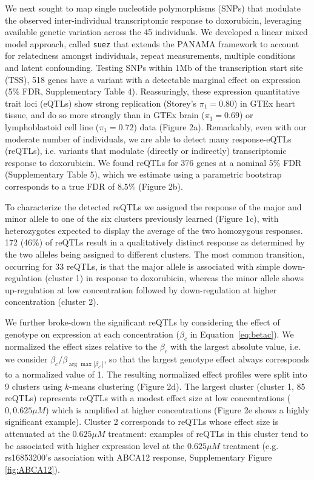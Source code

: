 \documentclass{article}
\begin{document}
We next sought to map single nucleotide polymorphisms (SNPs) that modulate the observed inter-individual transcriptomic response to doxorubicin, leveraging available genetic variation across the 45 individuals\cite{Livne2015}. We developed a linear mixed model approach, called \texttt{suez} that extends the PANAMA framework\citep{Fusi2012} to account for relatedness amongst individuals, repeat measurements, multiple conditions and latent confounding. Testing SNPs within 1Mb of the transcription start site (TSS), 518 genes have a variant with a detectable marginal effect on expression (5\% FDR, Supplementary Table 4). Reassuringly, these expression quantitative trait loci (eQTLs) show strong replication (Storey's $\pi_1=0.80$) in GTEx heart tissue, and do so more strongly than in GTEx brain ($\pi_1=0.69$) or lymphoblastoid cell line ($\pi_1=0.72$) data (Figure 2a). Remarkably, even with our moderate number of individuals, we are able to detect many response-eQTLs (reQTLs), i.e. variants that modulate (directly or indirectly) transcriptomic response to doxorubicin. We found reQTLs for 376 genes at a nominal 5\% FDR (Supplementary Table 5), which we estimate using a parametric bootstrap corresponds to a true FDR of $8.5\%$ (Figure 2b). 

To characterize the detected reQTLs we assigned the response of the major and minor allele to one of the six clusters previously learned (Figure 1c), with heterozygotes expected to display the average of the two homozygous responses. 172 (46\%) of reQTLs result in a qualitatively distinct response as determined by the two alleles being assigned to different clusters. The most common transition, occurring for 33 reQTLs, is that the major allele is associated with simple down-regulation (cluster 1) in response to doxorubicin, whereas the minor allele shows up-regulation at low concentration followed by down-regulation at higher concentration (cluster 2). 

We further broke-down the significant reQTLs by considering the effect of genotype on expression at each concentration ($\beta_c$ in Equation~\ref{eq:betac}). We normalized the effect sizes relative to the $\beta_c$ with the largest absolute value, i.e. we consider $\beta_c / \beta_{\arg \max{ |\beta_{c'}| }} $, so that the largest genotype effect always corresponds to a normalized value of 1. The resulting normalized effect profiles were split into 9 clusters using $k$-means clustering (Figure 2d). The largest cluster (cluster 1, 85 reQTLs) represents reQTLs with a modest effect size at low concentrations ($0,0.625\mu M$) which is amplified at higher concentrations (Figure 2e shows a highly significant example). Cluster 2 corresponds to reQTLs whose effect size is attenuated at the $0.625\mu M$ treatment: examples of reQTLs in this cluster tend to be associated with higher expression level at the $0.625\mu M$ treatment (e.g. rs16853200's association with ABCA12 response, Supplementary Figure \ref{fig:ABCA12}). 
\end{document}
